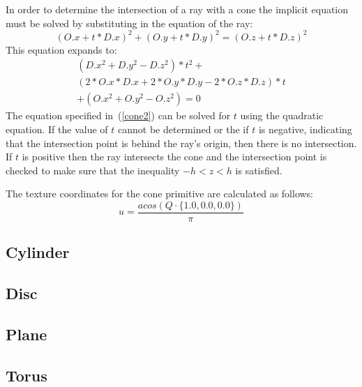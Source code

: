 In order to determine the intersection of a ray with a cone the implicit
equation must be solved by substituting in the equation of the ray:
\begin{equation}
  (O.x + t*D.x)^2 + (O.y + t*D.y)^2 = (O.z + t*D.z)^2\label{cone1}
\end{equation}
This equation expands to:
\begin{equation}
\begin{split}
  (D.x^2 + D.y^2 - D.z^2)*t^2 + \\
  (2*O.x*D.x + 2*O.y*D.y - 2*O.z*D.z)*t \\
  + (O.x^2 + O.y^2 - O.z^2) = 0\label{cone2}
\end{split}
\end{equation}
The equation specified in~(\ref{cone2}) can be solved for $t$ using the
quadratic equation. If the value of $t$ cannot be determined or the if $t$ is
negative, indicating that the intersection point is behind the ray's origin,
then there is no intersection. If $t$ is positive then the ray intersects the
cone and the intersection point is checked to make sure that the inequality $-h
< z < h$ is satisfied.

The texture coordinates for the cone primitive are calculated as follows:
\begin{equation}
  u = \frac{acos(Q \cdot \{1.0, 0.0, 0.0\})}{\pi}
\end{equation}

\subsection*{Cylinder}

\subsection*{Disc}

\subsection*{Plane}

\subsection*{Torus}

